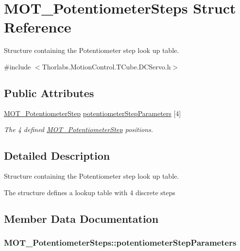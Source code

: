 \hypertarget{struct_m_o_t___potentiometer_steps}{}\section{M\+O\+T\+\_\+\+Potentiometer\+Steps Struct Reference}
\label{struct_m_o_t___potentiometer_steps}


Structure containing the Potentiometer step look up table.  




{\ttfamily \#include $<$Thorlabs.\+Motion\+Control.\+T\+Cube.\+D\+C\+Servo.\+h$>$}

\subsection*{Public Attributes}
\begin{DoxyCompactItemize}
\item 
\hyperlink{struct_m_o_t___potentiometer_step}{M\+O\+T\+\_\+\+Potentiometer\+Step} \hyperlink{struct_m_o_t___potentiometer_steps_af25db347041ee6a203f04c2791054266}{potentiometer\+Step\+Parameters} \mbox{[}4\mbox{]}
\begin{DoxyCompactList}\small\item\em The 4 defined \hyperlink{struct_m_o_t___potentiometer_step}{M\+O\+T\+\_\+\+Potentiometer\+Step} positions. \end{DoxyCompactList}\end{DoxyCompactItemize}


\subsection{Detailed Description}
Structure containing the Potentiometer step look up table. 

The structure defines a lookup table with 4 discrete steps

\subsection{Member Data Documentation}
\subsubsection[{\texorpdfstring{potentiometer\+Step\+Parameters}{potentiometerStepParameters}}]{ M\+O\+T\+\_\+\+Potentiometer\+Steps\+::potentiometer\+Step\+Parameters}\hypertarget{struct_m_o_t___potentiometer_steps_af25db347041ee6a203f04c2791054266}{}\label{struct_m_o_t___potentiometer_steps_af25db347041ee6a203f04c2791054266}


